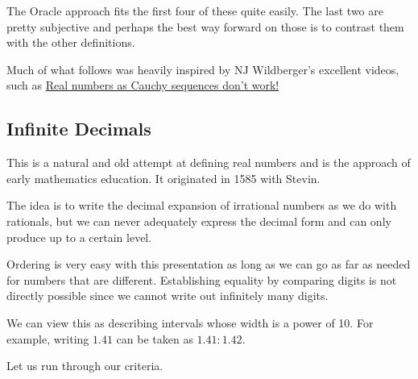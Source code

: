 \documentclass[12pt]{article}
\theoremstyle{remark}
\begin{document}
The Oracle approach fits the first four of these quite easily. The last two are pretty subjective and perhaps the best way forward on those is to contrast them with the other definitions. 

Much of what follows was heavily inspired by NJ Wildberger's excellent videos, such as \href{https://www.youtube.com/watch?v=3cI7sFr707s}{Real numbers as Cauchy sequences don't work!}


\subsection{Infinite Decimals}

This is a natural and old attempt at defining real numbers and is the approach of early mathematics education. It originated in 1585 with Stevin. 

The idea is to write the decimal expansion of irrational numbers as we do with rationals, but we can never adequately express the decimal form and can only produce up to a certain level. 

Ordering is very easy with this presentation as long as we can go as far as needed for numbers that are different. Establishing equality by comparing digits is not directly possible since we cannot write out infinitely many digits. 

We can view this as describing intervals whose width is a power of 10. For example, writing $1.41$ can be taken as $1.41:1.42$. 

Let us run through our criteria. 
\end{document}
